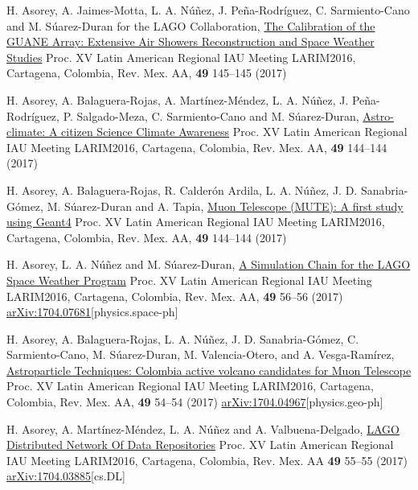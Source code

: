 \begin{etaremune}
\item {} H. Asorey, A. Jaimes-Motta, L. A. Núñez, J. Peña-Rodríguez, C. Sarmiento-Cano and M. Súarez-Duran for the LAGO Collaboration, \href{http://www.astroscu.unam.mx/rmaa/RMxAC..49/PDF/RMxAC..49\_poster3.pdf}{{The Calibration of the GUANE Array: Extensive Air Showers Reconstruction and Space Weather Studies}} \en Proc.
XV Latin American Regional IAU Meeting LARIM2016, Cartagena, Colombia, Rev.
Mex.
AA, {\textbf{49}} 145--145 (2017)

\item {} H. Asorey, A. Balaguera-Rojas, A. Martínez-Méndez, L. A. Núñez, J. Peña-Rodríguez, P. Salgado-Meza, C. Sarmiento-Cano and M. Súarez-Duran, \href{http://www.astroscu.unam.mx/rmaa/RMxAC..49/PDF/RMxAC..49\_poster2.pdf}{{Astro-climate: A citizen Science Climate Awareness}} \en Proc.
XV Latin American Regional IAU Meeting LARIM2016, Cartagena, Colombia, Rev.
Mex.
AA, {\textbf{49}} 144--144 (2017)

\item {} H. Asorey, A. Balaguera-Rojas, R. Calderón Ardila, L. A. Núñez, J. D. Sanabria-Gómez, M. Súarez-Duran and A. Tapia, \href{http://www.astroscu.unam.mx/rmaa/RMxAC..49/PDF/RMxAC..49\_poster2.pdf}{{Muon Telescope (MUTE): A first study using Geant4}} \en Proc.
XV Latin American Regional IAU Meeting LARIM2016, Cartagena, Colombia, Rev.
Mex.
AA, {\textbf{49}} 144--144 (2017)

\item {} H. Asorey, L. A. Núñez and M. Súarez-Duran, \href{http://www.astroscu.unam.mx/rmaa/RMxAC..49/PDF/RMxAC..49\_oral6.pdf}{{A Simulation Chain for the LAGO Space Weather Program}} \en Proc.
XV Latin American Regional IAU Meeting LARIM2016, Cartagena, Colombia, Rev.
Mex.
AA, {\textbf{49}} 56--56 (2017) \href{http://arxiv.org/abs/1704.07681}{arXiv:1704.07681}[physics.space-ph]

\item {} H. Asorey, A. Balaguera-Rojas, L. A. Núñez, J. D. Sanabria-Gómez, C. Sarmiento-Cano, M. Súarez-Duran, M. Valencia-Otero, and A. Vesga-Ramírez, \href{http://www.astroscu.unam.mx/rmaa/RMxAC..49/PDF/RMxAC..49\_oral4.pdf}{{Astroparticle Techniques: Colombia active volcano candidates for Muon Telescope}} \en Proc.
XV Latin American Regional IAU Meeting LARIM2016, Cartagena, Colombia, Rev.
Mex.
AA, {\textbf{49}} 54--54 (2017) \href{http://arxiv.org/abs/1704.04967}{arXiv:1704.04967}[physics.geo-ph]

\item {}H. Asorey, A. Martínez-Méndez, L. A. Núñez and A. Valbuena-Delgado, \href{http://www.astroscu.unam.mx/rmaa/RMxAC..49/PDF/RMxAC..49\_oral5.pdf}{{LAGO Distributed Network Of Data Repositories}} \en Proc.
XV Latin American Regional IAU Meeting LARIM2016, Cartagena, Colombia, Rev.
Mex.
AA {\textbf{49}} 55--55 (2017) \href{http://arxiv.org/abs/1704.03885}{arXiv:1704.03885}[cs.DL]


\end{etaremune}
